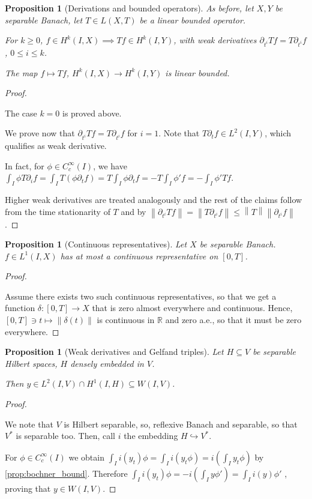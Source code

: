 \documentclass[english,a4paper,12pt,oneside]{scrbook}
\theoremstyle{break}
\newtheorem{prop}[equation]{Proposition}
\newenvironment{mproof}[1][\proofname]{%
  \begin{proof}[#1]$ $\par\nobreak\ignorespaces
}{%
  \end{proof}
}
\renewcommand*{\proofname}{Proof}
\theoremstyle{remark}
\newcommand{\mR}{\mathbb{R}}
\newcommand{\norm}[1]{\left\lVert#1\right\rVert}
\newcommand{\emb}{\hookrightarrow}
\begin{document}
\begin{prop}	[Derivations and bounded operators]
\label{lemma:bochner_Hk_map}
As before, let $X,Y$ be separable Banach, let $T \in L(X,T)$ be a linear bounded operator.

For $k\geq 0$, $f \in H^k(I,X)\implies Tf \in H^k(I,Y)$, with weak derivatives $\partial_{t^i}Tf = T\partial_{t^i}f$, $0\leq i \leq k$.

The map $f \mapsto Tf$, $H^k(I,X)\rightarrow H^k(I,Y)$ is linear bounded.
\end{prop}
\begin{mproof}
The case $k=0$ is proved above.

We prove now that $\partial_{t^i}Tf = T\partial_{t^i}f$ for $i=1$. Note that $T\partial_t f \in L^2(I,Y)$, which qualifies as weak derivative.

In fact, for $\phi \in C_c^\infty(I)$, we have $\int_I \phi T\partial_i f = \int_I T(\phi\partial_t f) = T \int_I\phi\partial_t f = -T\int_I\phi'f=-\int_I\phi'Tf$.

Higher weak derivatives are treated analogously and the rest of the claims follow from the time stationarity of $T$ and by $\norm{\partial_{t^i}Tf}=\norm{T\partial_{t^i}f}\leq \norm{T}\norm{\partial_{t^i}f}$.

\end{mproof}

\begin{prop}[Continuous representatives]
\label{prop:cts_repr}
Let $X$ be separable Banach. $f \in L^1(I,X)$ has at most a continuous representative on $[0,T]$.
\end{prop}
\begin{mproof}
Assume there exists two such continuous representatives, so that we get a function $\delta: [0,T] \rightarrow X$ that is zero almost everywhere and continuous. Hence, $[0,T] \ni t \mapsto \norm{\delta(t)}$ is continuous in $\mR$ and zero a.e., so that it must be zero everywhere.
\end{mproof}

\begin{prop}[Weak derivatives and Gelfand triples]
\label{prop:sob_implies_W}
Let $H\subseteq V$ be separable Hilbert spaces, $H$ densely embedded in $V$.

Then $y \in L^2(I,V)\cap H^1(I,H) \subseteq W(I,V)$.
\end{prop}
\begin{mproof}
We note that $V$ is Hilbert separable, so, reflexive Banach and separable, so that $V^*$ is separable too. Then, call $i$ the embedding $H \emb V^*$.

For $\phi \in C^\infty_c(I)$ we obtain $\int_I i(y_t)\phi=\int_I i(y_t\phi)= i \left ( \int_I y_t\phi \right )$ by \cref{prop:bochner_bound}. Therefore $\int_I i(y_t)\phi=-i \left ( \int_I y\phi' \right ) =\int_I i(y)\phi'  $ , proving that $y \in W(I,V)$.

\end{mproof}
\end{document}
